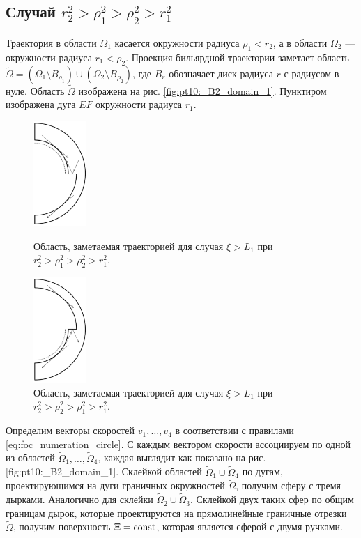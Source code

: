 \subsection{Случай $r_2^2 > \rho_1^2 > \rho_2^2 > r_1^2$}\label{sec:ch5/sec7/sub1}
Траектория в области $\Omega_1$ касается окружности радиуса $\rho_1 < r_2$, а в области $\Omega_2$ --- окружности радиуса $r_1 < \rho_2$. Проекция бильярдной траектории заметает область $\widetilde{\Omega} = (\Omega_1 \setminus B_{\rho_1}) \cup (\Omega_2 \setminus B_{\rho_2})$, где $B_r$ обозначает диск радиуса $r$ с радиусом в нуле. Область $\widetilde{\Omega}$ изображена на рис. \ref{fig:pt10:_B2_domain_1}. Пунктиром изображена дуга $EF$ окружности радиуса $r_1$. 
\begin{figure}[!htb]
\centering
\includegraphics[width=2cm]{images/ch4/section3_circular/atoms/sect3_B2_domain_1.pdf}
    \caption{Область, заметаемая траекторией для случая $\xi > L_1$ при $r_2^2 > \rho_1^2 > \rho_2^2 > r_1^2$.}
    \label{fig:pt10:_B2_domain_1}
\endminipage\hfill
{}
\centering
\includegraphics[width=2cm]{images/ch4/section3_circular/atoms/sect3_B2_domain_2.pdf}
    \caption{Область, заметаемая траекторией для случая $\xi > L_1$ при $r_2^2 > \rho_2^2 > \rho_1^2 > r_1^2$.}
        \label{fig:pt10:_B2_domain_2}
\endminipage\hfill
\end{figure}

Определим векторы скоростей $v_1, \ldots, v_4$ в соответствии с правилами \eqref{eq:foc_numeration_circle}. С каждым вектором скорости ассоциируем по одной из областей $\widetilde{\Omega}_1, \ldots, \widetilde{\Omega}_4$, каждая выглядит как показано на  рис. \ref{fig:pt10:_B2_domain_1}. 
Склейкой областей $\widetilde{\Omega}_1 \cup \widetilde{\Omega}_4$ по дугам, проектирующимся на дуги граничных окружностей $\widetilde{\Omega}$, получим сферу с тремя дырками. Аналогично для склейки $\widetilde{\Omega}_2 \cup \widetilde{\Omega}_3$. Склейкой двух таких сфер по общим границам дырок, которые проектируются на прямолинейные граничные отрезки $\widetilde{\Omega}$, получим поверхность $\Xi=\mathrm{const}$, которая является сферой с двумя ручками. 

